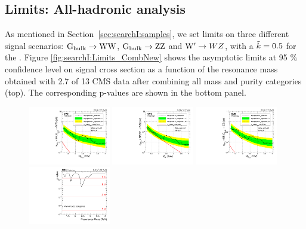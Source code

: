 \subsection{Limits: All-hadronic analysis}
\label{sec:searchI:results4q}
As mentioned in Section~\ref{sec:searchI:samples}, we set limits on three different signal scenarios: $\mathrm{G}_\mathrm{bulk} \rightarrow \mathrm{W}\mathrm{W}$, $\mathrm{G}_\mathrm{bulk} \rightarrow \mathrm{Z}\mathrm{Z}$ and $\mathrm{W}^\prime \rightarrow WZ$, with a $\tilde{k} = 0.5$ for the \BulkG. Figure \ref{fig:searchI:Limits_CombNew} shows the asymptotic limits at 95 \% confidence level on signal cross section as a function of the resonance mass obtained with 2.7 \fbinv of 13 \TeV CMS data after combining all mass and purity categories (top). The corresponding p-values are shown in the bottom panel.

\begin{figure}[h!]
\centering
\includegraphics[width=0.32\textwidth]{figures/analysis/search1/AN-15-211/limits/brazilianFlag_BulkWW_new_combined_13TeV.pdf}
\includegraphics[width=0.32\textwidth]{figures/analysis/search1/AN-15-211/limits/brazilianFlag_WZ_new_combined_13TeV.pdf}
\includegraphics[width=0.32\textwidth]{figures/analysis/search1/AN-15-211/limits/brazilianFlag_BulkZZ_new_combined_13TeV.pdf}\\
\includegraphics[width=0.32\textwidth]{figures/analysis/search1/AN-15-211/pvalues/pvalue_BulkWWin_combined_new.pdf}

\end{figure}
